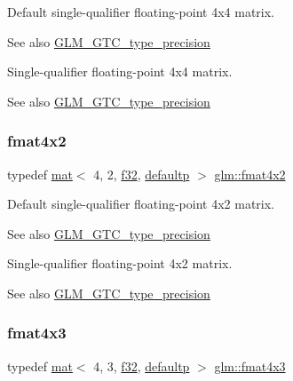 Default single-\/qualifier floating-\/point 4x4 matrix. \begin{DoxySeeAlso}{See also}
\mbox{\hyperlink{group__gtc__type__precision}{G\+L\+M\+\_\+\+G\+T\+C\+\_\+type\+\_\+precision}}
\end{DoxySeeAlso}
Single-\/qualifier floating-\/point 4x4 matrix. \begin{DoxySeeAlso}{See also}
\mbox{\hyperlink{group__gtc__type__precision}{G\+L\+M\+\_\+\+G\+T\+C\+\_\+type\+\_\+precision}} 
\end{DoxySeeAlso}
\mbox{\label{group__gtc__type__precision_ga279cf309f0098c3d26ce88fe8a26375a}} 
\subsubsection{\texorpdfstring{fmat4x2}{fmat4x2}}
{\footnotesize\ttfamily typedef \mbox{\hyperlink{structglm_1_1mat}{mat}}$<$ 4, 2, \mbox{\hyperlink{group__gtc__type__precision_ga0ec999b57f5330d9021256e96038df04}{f32}}, \mbox{\hyperlink{namespaceglm_a36ed105b07c7746804d7fdc7cc90ff25a9d21ccd8b5a009ec7eb7677befc3bf51}{defaultp}} $>$ \mbox{\hyperlink{group__gtc__type__precision_ga279cf309f0098c3d26ce88fe8a26375a}{glm\+::fmat4x2}}}

Default single-\/qualifier floating-\/point 4x2 matrix. \begin{DoxySeeAlso}{See also}
\mbox{\hyperlink{group__gtc__type__precision}{G\+L\+M\+\_\+\+G\+T\+C\+\_\+type\+\_\+precision}}
\end{DoxySeeAlso}
Single-\/qualifier floating-\/point 4x2 matrix. \begin{DoxySeeAlso}{See also}
\mbox{\hyperlink{group__gtc__type__precision}{G\+L\+M\+\_\+\+G\+T\+C\+\_\+type\+\_\+precision}} 
\end{DoxySeeAlso}
\mbox{\label{group__gtc__type__precision_ga0ab797a258612fe48345951a0bdd6b8c}} 
\subsubsection{\texorpdfstring{fmat4x3}{fmat4x3}}
{\footnotesize\ttfamily typedef \mbox{\hyperlink{structglm_1_1mat}{mat}}$<$ 4, 3, \mbox{\hyperlink{group__gtc__type__precision_ga0ec999b57f5330d9021256e96038df04}{f32}}, \mbox{\hyperlink{namespaceglm_a36ed105b07c7746804d7fdc7cc90ff25a9d21ccd8b5a009ec7eb7677befc3bf51}{defaultp}} $>$ \mbox{\hyperlink{group__gtc__type__precision_ga0ab797a258612fe48345951a0bdd6b8c}{glm\+::fmat4x3}}}

